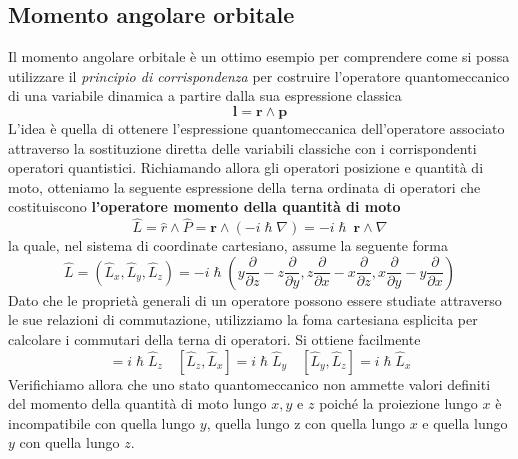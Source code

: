 \subsection{Momento angolare orbitale}\label{sec:momento-angolare-orbitale}

Il momento angolare orbitale è un ottimo esempio per comprendere come si
possa utilizzare il \emph{principio di corrispondenza} per costruire
l'operatore quantomeccanico di una variabile dinamica a partire dalla
sua espressione classica
\[
	\bm{l}  = \bm{r} \wedge \bm{p}
\]
L'idea è quella di ottenere l'espressione quantomeccanica
dell'operatore associato attraverso la sostituzione diretta delle
variabili classiche con i corrispondenti operatori quantistici.
Richiamando allora gli operatori posizione e quantità di moto, otteniamo
la seguente espressione della terna ordinata di operatori che
costituiscono \textbf{l'operatore momento della quantità di moto}
\begin{equation}
	\hat{L} = \hat{r} \wedge \hat{P}=\bm{r} \wedge (- i \hslash \nabla) = - i \hslash \ \bm{r} \wedge \nabla
    \label{eq:momentum-operator-2}
\end{equation}
la quale, nel sistema di coordinate cartesiano, assume la seguente forma
\begin{equation}
	\hat{L} = (\hat{L}_{x}, \hat{L}_{y}, \hat{L}_{z}) = - i \hslash \left( y \frac{\partial}{\partial z} - z \frac{\partial}{\partial y},z \frac{\partial}{\partial x}-x \frac{\partial}{\partial z}, x \frac{\partial}{\partial y} - y \frac{\partial}{\partial x} \right)
     \label{eq:momentum-operator-cartesian-coordinates}
\end{equation}
Dato che le proprietà generali di un operatore possono essere
studiate attraverso le sue relazioni di commutazione, utilizziamo la
foma cartesiana esplicita per calcolare i commutari della terna di
operatori.
Si ottiene facilmente
\begin{equation}
	[\hat{L}_{x},\hat{L}_{y}] = i \hslash  \hat{L}_{z} \quad
	[\hat{L}_{z},\hat{L}_{x}] = i \hslash  \hat{L}_{y} \quad
	[\hat{L}_{y},\hat{L}_{z}] = i \hslash  \hat{L}_{x}
	\label{eq:commutators-momentum-operator}
\end{equation}
Verifichiamo allora che uno stato quantomeccanico non ammette valori
definiti del momento della quantità di moto lungo \(x, y\) e \(z\)
poiché la proiezione lungo \(x\) è incompatibile con quella lungo \(y\),
quella lungo z con quella lungo \(x\) e quella lungo \(y\) con quella
lungo \(z\).
